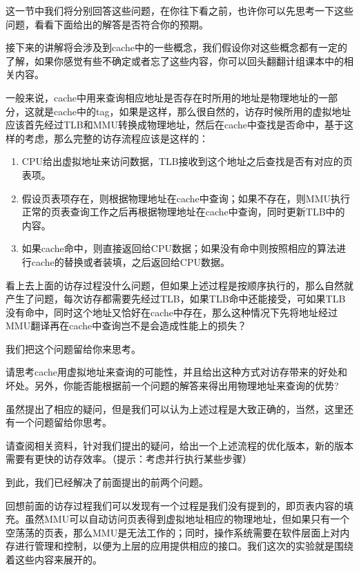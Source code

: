 这一节中我们将分别回答这些问题，在你往下看之前，也许你可以先思考一下这些问题，看看下面给出的解答是否符合你的预期。

接下来的讲解将会涉及到cache中的一些概念，我们假设你对这些概念都有一定的了解，如果你感觉有些不确定或者忘了这些内容，你可以回头翻翻计组课本中的相关内容。

一般来说，cache中用来查询相应地址是否存在时所用的地址是物理地址的一部分，这就是cache中的tag，如果是这样，那么很自然的，访存时候所用的虚拟地址应该首先经过TLB和MMU转换成物理地址，然后在cache中查找是否命中，基于这样的考虑，那么完整的访存流程应该是这样的：

\begin{enumerate}
  \item CPU给出虚拟地址来访问数据，TLB接收到这个地址之后查找是否有对应的页表项。
  \item 假设页表项存在，则根据物理地址在cache中查询；如果不存在，则MMU执行正常的页表查询工作之后再根据物理地址在cache中查询，同时更新TLB中的内容。
  \item 如果cache命中，则直接返回给CPU数据；如果没有命中则按照相应的算法进行cache的替换或者装填，之后返回给CPU数据。
\end{enumerate}

看上去上面的访存过程没什么问题，但如果上述过程是按顺序执行的，那么自然就产生了问题，每次访存都需要先经过TLB，如果TLB命中还能接受，可如果TLB没有命中，同时这个地址又恰好在cache中存在，那么这种情况下先将地址经过MMU翻译再在cache中查询岂不是会造成性能上的损失？

我们把这个问题留给你来思考。

\begin{thinking}\label{think-cache}
  请思考cache用虚拟地址来查询的可能性，并且给出这种方式对访存带来的好处和坏处。另外，你能否能根据前一个问题的解答来得出用物理地址来查询的优势?
\end{thinking}

虽然提出了相应的疑问，但是我们可以认为上述过程是大致正确的，当然，这里还有一个问题留给你思考。

\begin{thinking}\label{think-memory-access}
  请查阅相关资料，针对我们提出的疑问，给出一个上述流程的优化版本，新的版本需要有更快的访存效率。（提示：考虑并行执行某些步骤）
\end{thinking}

到此，我们已经解决了前面提出的前两个问题。

回想前面的访存过程我们可以发现有一个过程是我们没有提到的，即页表内容的填充。虽然MMU可以自动访问页表得到虚拟地址相应的物理地址，但如果只有一个空荡荡的页表，那么MMU是无法工作的；同时，操作系统需要在软件层面上对内存进行管理和控制，以便为上层的应用提供相应的接口。我们这次的实验就是围绕着这些内容来展开的。

